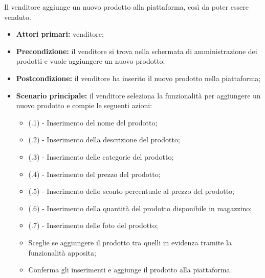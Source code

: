 Il venditore aggiunge un nuovo prodotto alla piattaforma, così da poter essere venduto.
\begin{itemize}
    \item \textbf{Attori primari:} venditore;
    \item \textbf{Precondizione:} il venditore si trova nella schermata di amministrazione dei prodotti e vuole aggiungere un nuovo prodotto;
    \item \textbf{Postcondizione:} il venditore ha inserito il nuovo prodotto nella piattaforma;
    \item \textbf{Scenario principale:} il venditore seleziona la funzionalità per aggiungere un nuovo prodotto e compie le seguenti azioni:
    \begin{itemize}
        \item (\actualUC.1) - Inserimento del nome del prodotto;
        \item (\actualUC.2) - Inserimento della descrizione del prodotto;
        \item (\actualUC.3) - Inserimento delle categorie del prodotto;
        \item (\actualUC.4) - Inserimento del prezzo del prodotto;
        \item (\actualUC.5) - Inserimento dello sconto percentuale al prezzo del prodotto;
        \item (\actualUC.6) - Inserimento della quantità del prodotto disponibile in magazzino;
        \item (\actualUC.7) - Inserimento delle foto del prodotto;
        \item Sceglie se aggiungere il prodotto tra quelli in evidenza tramite la funzionalità apposita;
        \item Conferma gli inserimenti e aggiunge il prodotto alla piattaforma.
    \end{itemize}
\end{itemize}

\resetSubUC

